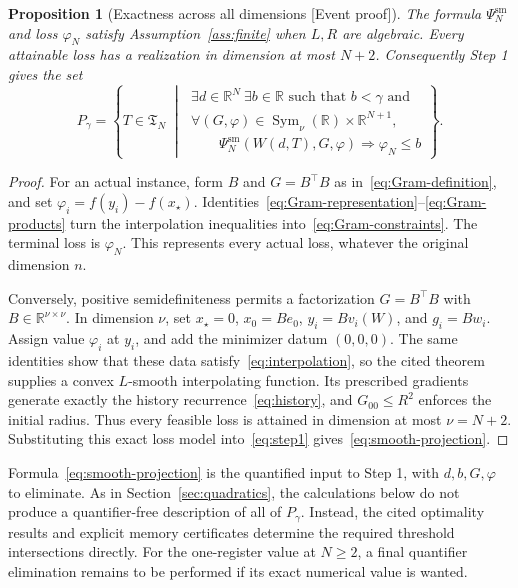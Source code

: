 \documentclass[11pt]{article}
\newcommand{\supportlabel}[1]{\textcolor{blue!60!black}{\small\textsf{[#1]}}}
\newcommand{\eventproof}{\supportlabel{Event proof}}
\numberwithin{equation}{section}
\newtheorem{proposition}[theorem]{Proposition}
\theoremstyle{definition}
\newcommand{\R}{\mathbb R}
\DeclareMathOperator{\Sym}{Sym}
\begin{document}
\begin{proposition}[Exactness across all dimensions \eventproof]\label{prop:smooth-model}
The formula $\Psi_N^{\mathrm{sm}}$ and loss $\varphi_N$ satisfy Assumption~\ref{ass:finite} when $L,R$ are algebraic. Every attainable loss has a realization in dimension at most $N+2$. Consequently Step 1 gives the set
\begin{equation}
 P_\gamma=\left\{T\in\mathfrak T_N\;\middle|\;
 \begin{array}{l}
 \exists d\in\R^N\ \exists b\in\R\text{ such that }b<\gamma\text{ and}\\[2pt]
 \forall(G,\varphi)\in\Sym_\nu(\R)\times\R^{N+1},\\[2pt]
 \qquad\Psi_N^{\mathrm{sm}}(W(d,T),G,\varphi)\Rightarrow\varphi_N\le b
 \end{array}
 \right\}.
 \label{eq:smooth-projection}
\end{equation}
\end{proposition}
\begin{proof}
For an actual instance, form $B$ and $G=B^\top B$ as in~\eqref{eq:Gram-definition}, and set $\varphi_i=f(y_i)-f(x_\star)$. Identities~\eqref{eq:Gram-representation}--\eqref{eq:Gram-products} turn the interpolation inequalities into~\eqref{eq:Gram-constraints}. The terminal loss is $\varphi_N$. This represents every actual loss, whatever the original dimension $n$.

Conversely, positive semidefiniteness permits a factorization $G=B^\top B$ with $B\in\R^{\nu\times\nu}$. In dimension $\nu$, set $x_\star=0$, $x_0=Be_0$, $y_i=Bv_i(W)$, and $g_i=Bw_i$. Assign value $\varphi_i$ at $y_i$, and add the minimizer datum $(0,0,0)$. The same identities show that these data satisfy~\eqref{eq:interpolation}, so the cited theorem supplies a convex $L$-smooth interpolating function. Its prescribed gradients generate exactly the history recurrence~\eqref{eq:history}, and $G_{00}\le R^2$ enforces the initial radius. Thus every feasible loss is attained in dimension at most $\nu=N+2$. Substituting this exact loss model into~\eqref{eq:step1} gives~\eqref{eq:smooth-projection}.
\end{proof}

Formula~\eqref{eq:smooth-projection} is the quantified input to Step 1, with $d,b,G,\varphi$ to eliminate. As in Section~\ref{sec:quadratics}, the calculations below do not produce a quantifier-free description of all of $P_\gamma$. Instead, the cited optimality results and explicit memory certificates determine the required threshold intersections directly. For the one-register value at $N\ge2$, a final quantifier elimination remains to be performed if its exact numerical value is wanted.
\end{document}
